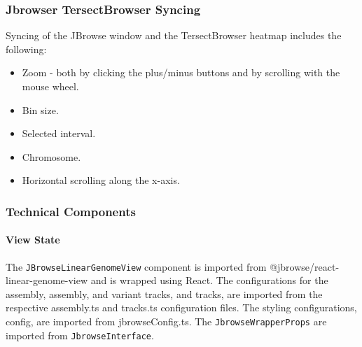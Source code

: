 \documentclass[12pt]{article}
\begin{document}
\subsubsection{Jbrowser TersectBrowser Syncing}

Syncing of the JBrowse window and the TersectBrowser heatmap includes the following:
    \begin{itemize}
        \item Zoom - both by clicking the plus/minus buttons and by scrolling with the mouse wheel.
        \item Bin size.
        \item Selected interval.
        \item Chromosome.
        \item Horizontal scrolling along the x-axis.
    \end{itemize}
    
\subsubsection{Technical Components}

\paragraph{View State} 
The \verb +JBrowseLinearGenomeView+ component is imported from @jbrowse/react-linear-genome-view and is wrapped using React. The configurations for the assembly, assembly, and variant tracks, and tracks, are imported from the respective assembly.ts and tracks.ts configuration files. The styling configurations, config, are imported from jbrowseConfig.ts. The \verb +JbrowseWrapperProps+ are imported from \verb +JbrowseInterface+. 
\end{document}
